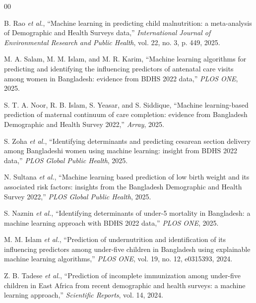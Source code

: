 \documentclass[conference]{IEEEtran}
\begin{document}
\balance
\begin{thebibliography}{00}

 B. Rao \textit{et al.}, ``Machine learning in predicting
child malnutrition: a meta-analysis of Demographic and Health Surveys data,''
\textit{International Journal of Environmental Research and Public Health},
vol. 22, no. 3, p. 449, 2025.

 M. A. Salam, M. M. Islam, and M. R. Karim, ``Machine
learning algorithms for predicting and identifying the influencing predictors
of antenatal care visits among women in Bangladesh: evidence from BDHS 2022
data,'' \textit{PLOS ONE}, 2025.

 S. T. A. Noor, R. B. Islam, S. Yeasar, and S. Siddique,
``Machine learning-based prediction of maternal continuum of care completion:
evidence from Bangladesh Demographic and Health Survey 2022,''
\textit{Array}, 2025.

 S. Zoha \textit{et al.}, ``Identifying determinants and
predicting cesarean section delivery among Bangladeshi women using machine
learning: insight from BDHS 2022 data,'' \textit{PLOS Global Public Health},
2025.

 N. Sultana \textit{et al.}, ``Machine learning based
prediction of low birth weight and its associated risk factors: insights from
the Bangladesh Demographic and Health Survey 2022,'' \textit{PLOS Global
Public Health}, 2025.

 S. Naznin \textit{et al.}, ``Identifying determinants of
under-5 mortality in Bangladesh: a machine learning approach with BDHS 2022
data,'' \textit{PLOS ONE}, 2025.

 M. M. Islam \textit{et al.}, ``Prediction of
undernutrition and identification of its influencing predictors among
under-five children in Bangladesh using explainable machine learning
algorithms,'' \textit{PLOS ONE}, vol. 19, no. 12, e0315393, 2024.

 Z. B. Tadese \textit{et al.}, ``Prediction of incomplete
immunization among under-five children in East Africa from recent demographic
and health surveys: a machine learning approach,'' \textit{Scientific
Reports}, vol. 14, 2024.


\end{thebibliography}
\end{document}
